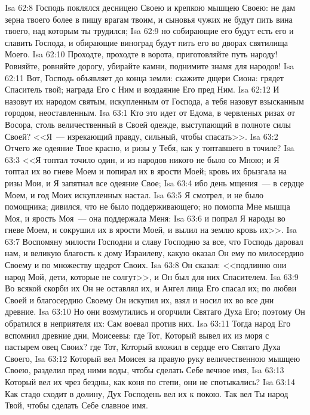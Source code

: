 \vs Isa 62:8 Господь поклялся десницею Своею и крепкою мышцею Своею: не дам зерна твоего более в пищу врагам твоим, и сыновья чужих не будут пить вина твоего, над которым ты трудился;
\vs Isa 62:9 но собирающие его будут есть его и славить Господа, и обирающие виноград будут пить  его во дворах святилища Моего.
\vs Isa 62:10 Проходте, проходте в ворота, приготовляйте путь народу! Ровняйте, ровняйте дорогу, убирайте камни, поднимите знамя для народов!
\vs Isa 62:11 Вот, Господь объявляет до конца земли: скажите дщери Сиона: грядет Спаситель твой; награда Его с Ним и воздаяние Его пред Ним.
\vs Isa 62:12 И назовут их народом святым, искупленным от Господа, а тебя назовут взысканным городом, неоставленным.
\vs Isa 63:1 Кто это идет от Едома, в червленых ризах от Восора, столь величественный в Своей одежде, выступающий в полноте силы Своей? <<Я~--- изрекающий правду, сильный, чтобы спасать>>.
\vs Isa 63:2 Отчего же одеяние Твое красно, и ризы у Тебя, как у топтавшего в точиле?
\vs Isa 63:3 <<Я топтал точило один, и из народов никого не было со Мною; и Я топтал их во гневе Моем и попирал их в ярости Моей; кровь их брызгала на ризы Мои, и Я запятнал все одеяние Свое;
\vs Isa 63:4 ибо день мщения~--- в сердце Моем, и год Моих искупленных настал.
\vs Isa 63:5 Я смотрел, и не было помощника; дивился, что не было поддерживающего; но помогла Мне мышца Моя, и ярость Моя~--- она поддержала Меня:
\vs Isa 63:6 и попрал Я народы во гневе Моем, и сокрушил их в ярости Моей, и вылил на землю кровь их>>.
\vs Isa 63:7 Воспомяну милости Господни и славу Господню за все, что Господь даровал нам, и великую благость  к дому Израилеву, какую оказал Он ему по милосердию Своему и по множеству щедрот Своих.
\rsbpar\vs Isa 63:8 Он сказал: <<подлинно они народ Мой, дети, которые не солгут>>, и Он был для них Спасителем.
\vs Isa 63:9 Во всякой скорби их Он не оставлял их, и Ангел лица Его спасал их; по любви Своей и благосердию Своему Он искупил их, взял и носил их во все дни древние.
\vs Isa 63:10 Но они возмутились и огорчили Святаго Духа Его; поэтому Он обратился в неприятеля их: Сам воевал против них.
\vs Isa 63:11 Тогда народ Его вспомнил древние дни, Моисеевы: где Тот, Который вывел их из моря с пастырем овец Своих? где Тот, Который вложил в сердце его Святаго Духа Своего,
\vs Isa 63:12 Который вел Моисея за правую руку величественною мышцею Своею, разделил пред ними воды, чтобы сделать Себе вечное имя,
\vs Isa 63:13 Который вел их чрез бездны, как коня по степи,  они не спотыкались?
\vs Isa 63:14 Как стадо сходит в долину, Дух Господень вел их к покою. Так вел Ты народ Твой, чтобы сделать Себе славное имя.

